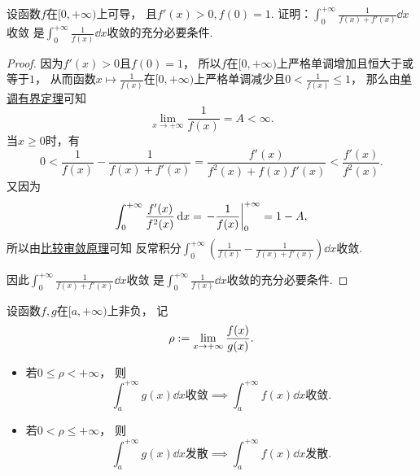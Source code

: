 \begin{example}
设函数\(f\)在\([0,+\infty)\)上可导，
且\(f'(x)>0,f(0)=1\).
证明：\(\int_0^{+\infty} \frac1{f(x)+f'(x)} \dd{x}\)收敛
是\(\int_0^{+\infty} \frac1{f(x)} \dd{x}\)收敛的充分必要条件.
\begin{proof}
因为\(f'(x)>0\)且\(f(0)=1\)，
所以\(f\)在\([0,+\infty)\)上严格单调增加且恒大于或等于\(1\)，
从而函数\(x \mapsto \frac1{f(x)}\)在\([0,+\infty)\)上严格单调减少且\(0 < \frac1{f(x)} \leq 1\)，
那么由\hyperref[theorem:极限.函数的单调有界定理]{单调有界定理}可知\begin{equation*}
	\lim_{x\to+\infty} \frac1{f(x)} = A < \infty.
\end{equation*}
当\(x\geq0\)时，有\begin{equation*}
	0 < \frac1{f(x)} - \frac1{f(x)+f'(x)}
	= \frac{f'(x)}{f^2(x)+f(x) f'(x)}
	< \frac{f'(x)}{f^2(x)}.
\end{equation*}
又因为\begin{equation*}
	\int_0^{+\infty} \frac{f'(x)}{f^2(x)} \dd{x}
	= \eval{-\frac1{f(x)}}_0^{+\infty}
	= 1 - A,
\end{equation*}
所以由\hyperref[theorem:定积分.无穷限反常积分的比较审敛原理]{比较审敛原理}可知
反常积分\(\int_0^{+\infty} \left( \frac1{f(x)} - \frac1{f(x)+f'(x)} \right) \dd{x}\)收敛.

因此\(\int_0^{+\infty} \frac1{f(x)+f'(x)} \dd{x}\)收敛
是\(\int_0^{+\infty} \frac1{f(x)} \dd{x}\)收敛的充分必要条件.
\end{proof}
\end{example}

\begin{corollary}[比较审敛原理的极限形式]
设函数\(f,g\)在\([a,+\infty)\)上非负，
记\begin{equation*}
	\rho := \lim_{x\to+\infty} \frac{f(x)}{g(x)}.
\end{equation*}
\begin{itemize}
	\item 若\(0 \leq \rho < +\infty\)，
	则\begin{equation*}
		\text{\(\int_a^{+\infty} g(x) \dd{x}\)收敛}
		\implies
		\text{\(\int_a^{+\infty} f(x) \dd{x}\)收敛}.
	\end{equation*}
	\item 若\(0 < \rho \leq +\infty\)，
	则\begin{equation*}
		\text{\(\int_a^{+\infty} g(x) \dd{x}\)发散}
		\implies
		\text{\(\int_a^{+\infty} f(x) \dd{x}\)发散}.
	\end{equation*}
\end{itemize}
\end{corollary}

